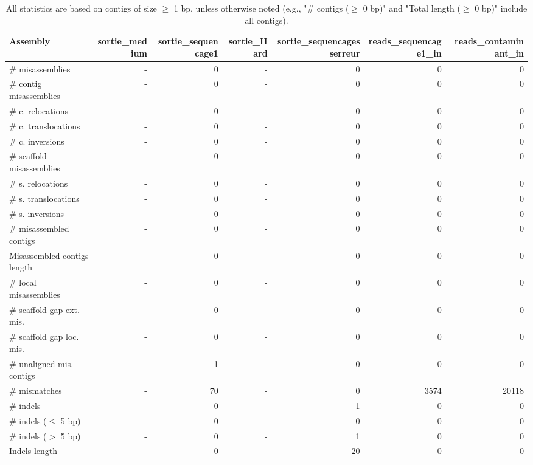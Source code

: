 \documentclass[12pt,a4paper]{article}
\begin{document}
\begin{table}[ht]
\begin{center}
\caption{All statistics are based on contigs of size $\geq$ 1 bp, unless otherwise noted (e.g., "\# contigs ($\geq$ 0 bp)" and "Total length ($\geq$ 0 bp)" include all contigs).}
\begin{tabular}{|l*{6}{|r}|}
\hline
Assembly & sortie\_medium & sortie\_sequencage1 & sortie\_Hard & sortie\_sequencagesserreur & reads\_sequencage1\_in & reads\_contaminant\_in \\ \hline
\# misassemblies & - & 0 & - & 0 & 0 & 0 \\ \hline
\hspace{2mm}\# contig misassemblies & - & 0 & - & 0 & 0 & 0 \\ \hline
\hspace{5mm}\# c. relocations & - & 0 & - & 0 & 0 & 0 \\ \hline
\hspace{5mm}\# c. translocations & - & 0 & - & 0 & 0 & 0 \\ \hline
\hspace{5mm}\# c. inversions & - & 0 & - & 0 & 0 & 0 \\ \hline
\hspace{2mm}\# scaffold misassemblies & - & 0 & - & 0 & 0 & 0 \\ \hline
\hspace{5mm}\# s. relocations & - & 0 & - & 0 & 0 & 0 \\ \hline
\hspace{5mm}\# s. translocations & - & 0 & - & 0 & 0 & 0 \\ \hline
\hspace{5mm}\# s. inversions & - & 0 & - & 0 & 0 & 0 \\ \hline
\# misassembled contigs & - & 0 & - & 0 & 0 & 0 \\ \hline
Misassembled contigs length & - & 0 & - & 0 & 0 & 0 \\ \hline
\# local misassemblies & - & 0 & - & 0 & 0 & 0 \\ \hline
\# scaffold gap ext. mis. & - & 0 & - & 0 & 0 & 0 \\ \hline
\# scaffold gap loc. mis. & - & 0 & - & 0 & 0 & 0 \\ \hline
\# unaligned mis. contigs & - & 1 & - & 0 & 0 & 0 \\ \hline
\# mismatches & - & 70 & - & 0 & 3574 & 20118 \\ \hline
\# indels & - & 0 & - & 1 & 0 & 0 \\ \hline
\hspace{5mm}\# indels ($\leq$ 5 bp) & - & 0 & - & 0 & 0 & 0 \\ \hline
\hspace{5mm}\# indels ($>$ 5 bp) & - & 0 & - & 1 & 0 & 0 \\ \hline
Indels length & - & 0 & - & 20 & 0 & 0 \\ \hline
\end{tabular}
\end{center}
\end{table}
\end{document}

